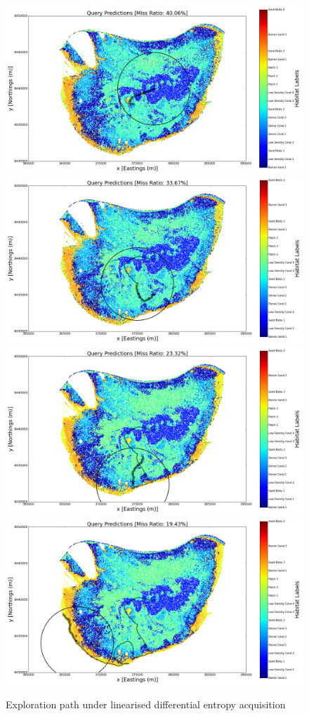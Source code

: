 \documentclass{article}
\begin{document}
\begin{figure}[!htbp]
			\includegraphics[width = 0.24\linewidth]{Figures/location_1_lde_path/pred_propose_step1.png}
			\includegraphics[width = 0.24\linewidth]{Figures/location_1_lde_path/pred_propose_step50.png}
			\includegraphics[width = 0.24\linewidth]{Figures/location_1_lde_path/pred_propose_step100.png}
			\includegraphics[width = 0.24\linewidth]{Figures/location_1_lde_path/pred_propose_step200.png}			
		\caption{Exploration path under linearised differential entropy acquisition}
		\label{Figure:Results:OptimalPathLDE}
		\end{figure}
\end{document}
